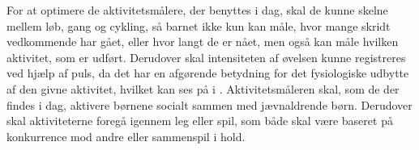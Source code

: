 For at optimere de aktivitetsmålere, der benyttes i dag, skal de kunne skelne mellem løb, gang og cykling, så barnet ikke kun kan måle, hvor mange skridt vedkommende har gået, eller hvor langt de er nået, men også kan måle hvilken aktivitet, som er udført. Derudover skal intensiteten af øvelsen kunne registreres ved hjælp af puls, da det har en afgørende betydning for det fysiologiske udbytte af den givne aktivitet, hvilket kan ses på  i .\newline
Aktivitetsmåleren skal, som de der findes i dag, aktivere børnene socialt sammen med jævnaldrende børn. Derudover skal aktiviteterne foregå igennem leg eller spil, som både skal være baseret på konkurrence mod andre eller sammenspil i hold. 